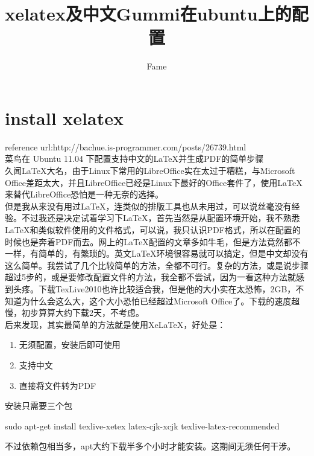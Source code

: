 \documentclass{article}
\begin{document}
\title{xelatex及中文Gummi在ubuntu上的配置}
\author{Fame}
\maketitle


\section{install xelatex}
reference url:http://bachue.is-programmer.com/posts/26739.html\\
菜鸟在 Ubuntu 11.04 下配置支持中文的LaTeX并生成PDF的简单步骤\\

久闻LaTeX大名，由于Linux下常用的LibreOffice实在太过于糟糕，与Microsoft Office差距太大，并且LibreOffice已经是Linux下最好的Office套件了，使用LaTeX来替代LibreOffice恐怕是一种无奈的选择。\\
但是我从来没有用过LaTeX，连类似的排版工具也从未用过，可以说丝毫没有经验。不过我还是决定试着学习下LaTeX，首先当然是从配置环境开始，我不熟悉LaTeX和类似软件使用的文件格式，可以说，我只认识PDF格式，所以在配置的时候也是奔着PDF而去。网上的LaTeX配置的文章多如牛毛，但是方法竟然都不一样，有简单的，有繁琐的。英文LaTeX环境很容易就可以搞定，但是中文却没有这么简单。我尝试了几个比较简单的方法，全都不可行。复杂的方法，或是说步骤超过5步的，或是要修改配置文件的方法，我全都不尝试，因为一看这种方法就感到头疼。下载TexLive2010也许比较适合我，但是他的大小实在太恐怖，2GB，不知道为什么会这么大，这个大小恐怕已经超过Microsoft Office了。下载的速度超慢，初步算算大约下载2天，不考虑。\\
后来发现，其实最简单的方法就是使用XeLaTeX，好处是：
\begin{enumerate}
\item 无须配置，安装后即可使用
\item 支持中文
\item 直接将文件转为PDF
\end{enumerate}


安装只需要三个包
    
sudo apt-get install texlive-xetex latex-cjk-xcjk texlive-latex-recommended

不过依赖包相当多，apt大约下载半多个小时才能安装。这期间无须任何干涉。
\end{document}
